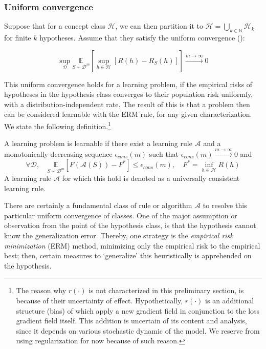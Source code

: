 \documentclass[10pt]{article} %
\begin{document}
\subsubsection{Uniform convergence}

Suppose that for a concept class $\mathcal{H}$, we can then partition it to $\mathcal{H}=\bigcup_{k\in \mathbb{N}} \mathcal{H}_{k}$ for finite $k$ hypotheses. Assume that they satisfy the uniform convergence (\cite{JMLR:v11:shalev-shwartz10a}): 

\begin{equation}
    \sup_{\mathcal{D}} \underset{S\sim\mathcal{D}^{m}}{\mathbb{E}} \left[ \sup_{h\in\mathcal{H}} [R(h) - R_{S}(h)] \right] \overset{m\to\infty}{\longrightarrow} 0
\end{equation}

This uniform convergence holds for a learning problem, if the empirical risks of hypotheses in the hypothesis class converges to their population risk uniformly, with a distribution-independent rate. The result of this is that a problem then can be considered learnable with the ERM rule, for any given characterization. We state the following definition.\footnote{The reason why $r(\cdot)$ is not characterized in this preliminary section, is because of their uncertainty of effect. Hypothetically, $r(\cdot)$ is an additional structure (bias) of which apply a new gradient field in conjunction to the loss gradient field itself. This addition is uncertain of its content and analysis, since it depends on various stochastic dynamic of the model. We reserve from using regularization for now because of such reason.}

\begin{definition}
    A learning problem is learnable if there exist a learning rule $\mathcal{A}$ and a monotonically decreasing sequence $\epsilon_{cons}(m)$ such that $\epsilon_{cons}(m)\overset{m\to\infty}{\longrightarrow} 0$ and \begin{equation}
        \forall \mathcal{D} , \quad \underset{S\sim\mathcal{D}^{m}}{\mathbb{E}} \left[F(\mathcal{A}(S))-F^{*}\right] \leq \epsilon_{cons}(m) , \quad F^{*} = \inf_{h\in\mathcal{H}} R(h)
    \end{equation}
    A learning rule $\mathcal{A}$ for which this hold is denoted as a universally consistent learning rule. 
\end{definition}

There are certainly a fundamental class of rule or algorithm $\mathcal{A}$ to resolve this particular uniform convergence of classes. One of the major assumption or observation from the point of the hypothesis class, is that the hypothesis cannot know the generalization error. Thereby, one strategy is the \textit{empirical risk minimization} (ERM) method, minimizing only the empirical risk to the empirical best; then, certain measures to `generalize' this heuristically is apprehended on the hypothesis. 
\end{document}
